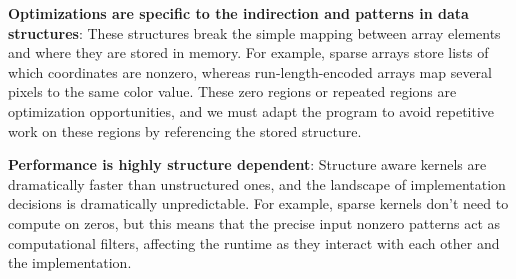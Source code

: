 %
%

\textbf{Optimizations are specific to the indirection and patterns in data structures}: 
%
These structures break the simple mapping between array elements and where they are stored in memory.
%
For example, sparse arrays store lists of which coordinates are nonzero, whereas run-length-encoded arrays map several pixels to the same color value. 
%
These zero regions or repeated regions are optimization opportunities, and we must adapt the program to avoid repetitive work on these regions by referencing the stored structure.

\textbf{Performance is highly structure dependent}: Structure aware kernels are dramatically faster than unstructured ones, and the landscape of implementation decisions is dramatically unpredictable. 
%
For example, sparse kernels don't need to compute on zeros, but this means that the precise input nonzero patterns act as computational filters, affecting the runtime as they interact with each other and the implementation.


